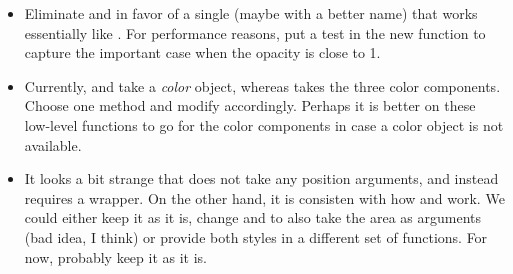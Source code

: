 \begin{itemize}
\item Eliminate  and  in
  favor of a single  (maybe with a better name)
  that works essentially like .  For
  performance reasons, put a test in the new function to capture the
  important case when the opacity is close to 1. 

\item Currently,  and  take
  a \emph{color} object, whereas  takes the three
  color components.  Choose one method and modify accordingly.
  Perhaps it is better on these low-level functions to go for the
  color components in case a color object is not available. 

\item It looks a bit strange that  does not take any
  position arguments, and instead requires a 
  wrapper.  On the other hand, it is consisten with how
   and  work.  We could
  either keep it as it is, change  and
   to also take the area as arguments (bad
  idea, I think) or provide both styles in a different set of
  functions.   For now, probably keep it as it is.

\end{itemize}

